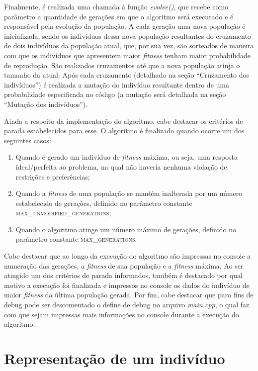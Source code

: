 \documentclass[12pt]{article}
\begin{document}
Finalmente, é realizada uma chamada à função \emph{evolve()}, que recebe como parâmetro a quantidade de gerações em que o algoritmo será executado e é responsável pela evolução da população. A cada geração uma nova população é inicializada, sendo os indivíduos dessa nova população resultantes do cruzamento de dois indivíduos da população atual, que, por sua vez, são sorteados de maneira com que os indivíduos que apresentem maior \textit{fitness} tenham maior probabilidade de reprodução. São realizados cruzamentos até que a nova população atinja o tamanho da atual. Após cada cruzamento (detalhado na seção ``Cruzamento dos indivíduos'') é realizada a mutação do indivíduo resultante dentro de uma probabilidade especificada no código (a mutação será detalhada na seção ``Mutação dos indivíduos'').

Ainda a respeito da implementação do algoritmo, cabe destacar os critérios de parada estabelecidos para esse. O algoritmo é finalizado quando ocorre um dos seguintes casos:

\begin{enumerate}
    \item Quando é gerado um indivíduo de \textit{fitness} máxima, ou seja, uma resposta ideal/perfeita ao problema, na qual não haveria nenhuma violação de restrições e preferências;
    \item Quando a \textit{fitness} de uma população se mantém inalterada por um número estabelecido de gerações, definido no parâmetro constante \textsc{max\_unmodified\_generations};
    \item Quando o algoritmo atinge um número máximo de gerações, definido no parâmetro constante \textsc{max\_generations}.    
\end{enumerate}

Cabe destacar que ao longo da execução do algoritmo são impressas no console a numeração das gerações, a \textit{fitness} de sua população e a \textit{fitness} máxima. Ao ser atingido um dos critérios de parada informados, também é destacado por qual motivo a execução foi finalizada e impressos no console os dados do indivíduo de maior \textit{fitness} da última população gerada. Por fim, cabe destacar que para fins de debug pode ser descomentado o define de debug no arquivo \textit{main.cpp}, o qual faz com que sejam impressas mais informações no console durante a execução do algoritmo.

\section{Representação de um indivíduo}
\end{document}
